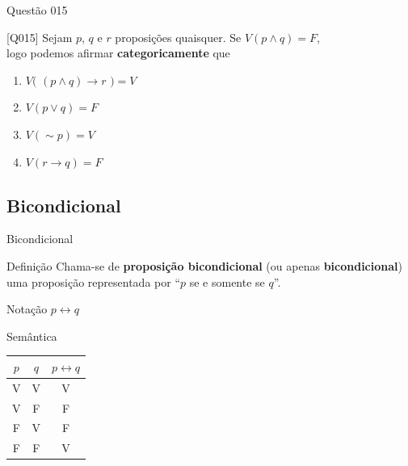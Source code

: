 \documentclass[xcolor=dvipsnames,table]{beamer}
\begin{document}
\begin{frame}{Questão 015}
\begin{block}{[Q015]}
	Sejam $p$, $q$ e $r$ proposições quaisquer. Se $V(p \wedge q) = F$, \\
	logo podemos afirmar {\bf categoricamente} que
\end{block}
\begin{enumerate}[label=(\Alph*)]
	\item $V($ $(p \wedge q) \rightarrow r$ $) = V$
	\item $V(p \vee q) = F$
	\item $V( \sim p) = V$
	\item $V(r \rightarrow q) = F$
\end{enumerate}
\end{frame}

\subsection{Bicondicional}
\begin{frame}{Bicondicional}
\begin{block}{Definição}
	Chama-se de {\bf proposição bicondicional} (ou apenas {\bf bicondicional}) uma proposição representada por ``$p$ se e somente se $q$''.
\end{block} \pause
\begin{block}{Notação}
	$p \leftrightarrow q$
\end{block} \pause
\begin{block}{Semântica}
	\begin{center}
		\begin{tabular}{|cc|c|}
			\hline
			$p$	&	$q$	&	$p \leftrightarrow q$	\\
			\hline
			V	&	V	&	V	\\
			V	&	F	&	F	\\
			F	&	V	&	F	\\
			F	&	F	&	V	\\
			\hline
		\end{tabular}
	\end{center}
\end{block}
\end{frame}
\end{document}
